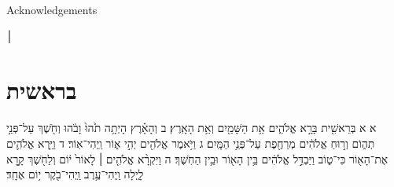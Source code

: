 \documentclass[twoside, openany, parskip=half, 11pt]{book}
\begin{document}
	\begin{minipage}{\textwidth}
		
		\begin{center} %
			\begin{LARGE}
				Acknowledgements
			\end{LARGE}
		\end{center}
		
		\begin{english}
׀
			
			
		\end{english}
		
	\end{minipage}
	
	
	
	
	
	\renewcommand{\contentsname}{}
	\tableofcontents
	
	\clearpage
	
	
	
	\setcounter{page}{1}
	
	\vspace*{\fill}
	
	\thispagestyle{empty}
	\begin{Large}
		\begin{center}
		\end{center}
	\end{Large}
	
	
	\vspace*{\fill}
	
	
	\centerlast
	
	\chapter[בראשית]{ בראשית }

א א בְּרֵאשִׁ֖ית בָּרָ֣א אֱלֹהִ֑ים אֵ֥ת הַשָּׁמַ֖יִם וְאֵ֥ת הָאָֽרֶץ׃ ב וְהָאָ֗רֶץ הָיְתָ֥ה תֹ֙הוּ֙ וָבֹ֔הוּ וְחֹ֖שֶׁךְ עַל־פְּנֵ֣י תְה֑וֹם וְר֣וּחַ אֱלֹהִ֔ים מְרַחֶ֖פֶת עַל־פְּנֵ֥י הַמָּֽיִם׃ ג וַיֹּ֥אמֶר אֱלֹהִ֖ים יְהִ֣י א֑וֹר וַֽיְהִי־אֽוֹר׃ ד וַיַּ֧רְא אֱלֹהִ֛ים אֶת־הָא֖וֹר כִּי־ט֑וֹב וַיַּבְדֵּ֣ל אֱלֹהִ֔ים בֵּ֥ין הָא֖וֹר וּבֵ֥ין הַחֹֽשֶׁךְ׃ ה וַיִּקְרָ֨א אֱלֹהִ֤ים ׀ לָאוֹר֙ י֔וֹם וְלַחֹ֖שֶׁךְ קָ֣רָא לָ֑יְלָה וַֽיְהִי־עֶ֥רֶב וַֽיְהִי־בֹ֖קֶר י֥וֹם אֶחָֽד׃
\end{document}
